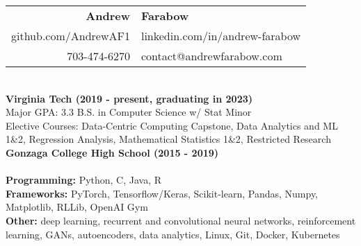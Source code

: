 \documentclass{article}
\begin{document}
\begin{center}
  \begin{tabular}{r l}
    {\huge\textbf{Andrew}}             & {\huge\textbf{Farabow}}        \\
    \hspace{35pt} github.com/AndrewAF1 & linkedin.com/in/andrew-farabow \\
    703-474-6270                       & contact@andrewfarabow.com      \\
  \end{tabular}


  \begin{flushleft}
    \begin{multicols}{2}
      {\large\textbf{\underline{}}} \\
      \textbf{Virginia Tech (2019 - present, graduating in 2023)} \\
      Major GPA: 3.3 \; B.S. in Computer Science w/ Stat Minor \\
      Elective Courses: Data-Centric Computing Capstone, Data Analytics and ML 1\&2, Regression Analysis, Mathematical Statistics 1\&2, Restricted Research \\
      \textbf{Gonzaga College High School	(2015 - 2019)} \\


      \columnbreak
      {\large\textbf{\underline{}}} \\
      {\textbf{Programming:}} Python, C, Java, R \\
      {\textbf{Frameworks:}} PyTorch, Tensorflow/Keras, Scikit-learn, Pandas, Numpy, Matplotlib, RLLib, OpenAI Gym \\
      {\textbf{Other:}} deep learning, recurrent and convolutional neural networks, reinforcement learning, GANs, autoencoders, data analytics, Linux, Git, Docker, Kubernetes \\ %

    \end{multicols}

    {\large\textbf{\underline{}}} \\



\end{flushleft}
\end{center}
\end{document}
